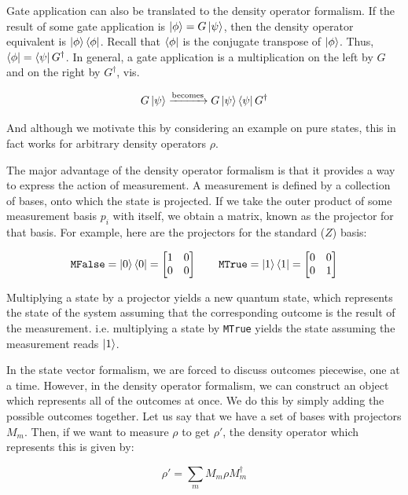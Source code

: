 Gate application can also be translated to the density operator formalism. 
% 
If the result of some gate application is $\ket\phi = G \ket\psi$, then the density operator equivalent is $\ket\phi \bra\phi$.
% 
Recall that $\bra\phi$ is the conjugate transpose of $\ket\phi$. 
% 
Thus, $\bra\phi = \bra\psi G^\dagger$.
% 
In general, a gate application is a multiplication on the left by $G$ and on the right by $G^\dagger$, vis.

$$
  G \ket \psi \xrightarrow[]{\text{becomes}} G \ket \psi \bra \psi G^\dagger
$$

\noindent And although we motivate this by considering an example on pure states, this in fact works for arbitrary density operators $\rho$.


The major advantage of the density operator formalism is that it provides a way to express the action of measurement.
% 
A measurement is defined by a collection of bases, onto which the state is projected. 
% 
If we take the outer product of some measurement basis $p_i$ with itself, we obtain a matrix, known as the projector for that basis. 
% 
For example, here are the projectors for the standard ($Z$) basis:

$$
  \texttt{MFalse} = \ket0  \bra0 = \begin{bmatrix}
    1 & 0 \\
    0 & 0
  \end{bmatrix}
  \quad \quad
  \texttt{MTrue} = \ket1  \bra1 = \begin{bmatrix}
    0 & 0 \\
    0 & 1
  \end{bmatrix}
$$


\noindent Multiplying a state by a projector yields a new quantum state, which represents the state
of the system assuming that the corresponding outcome is the result of the measurement.
% 
i.e. multiplying a state by \texttt{MTrue} yields the state assuming the measurement reads
$\ket 1$.


In the state vector formalism, we are forced to discuss outcomes piecewise, one at a time.
% 
However, in the density operator formalism, we can construct an object which represents all of the outcomes at once. 
% 
We do this by simply adding the possible outcomes together.
% 
Let us say that we have a set of bases with projectors $M_m$.
% 
Then, if we want to measure $\rho$ to get $\rho'$,
the density operator which represents this is given by:

$$
\rho' = \sum_m M_m \rho M_m^\dagger
$$

